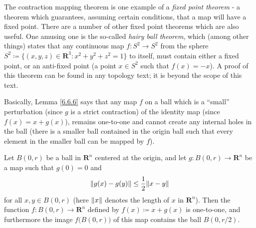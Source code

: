\begin{remark}\label{6.6.5}
    The contraction mapping theorem is one example of a \emph{fixed point theorem}
    - a theorem which guarantees, assuming certain conditions, that a map will have a fixed point.
    There are a number of other fixed point theorems which are also useful.
    One amusing one is the so-called \emph{hairy ball theorem}, which (among other things) states that any continuous map \(f : S^2 \to S^2\) from the sphere \(S^2 \coloneqq \{(x, y, z) \in \mathbf{R}^3 : x^2 + y^2 + z^2 = 1\}\) to itself, must contain either a fixed point, or an anti-fixed point
    (a point \(x \in S^2\) such that \(f(x) = -x\)).
    A proof of this theorem can be found in any topology text;
    it is beyond the scope of this text.
\end{remark}

\begin{note}
    Basically, Lemma \ref{6.6.6} says that any map \(f\) on a ball which is a ``small'' perturbation (since \(g\) is a strict contraction) of the identity map (since \(f(x) = x + g(x)\)), remains one-to-one and cannot create any internal holes in the ball
    (there is a smaller ball contained in the origin ball such that every element in the smaller ball can be mapped by \(f\)).
\end{note}

\begin{lemma}\label{6.6.6}
    Let \(B(0, r)\) be a ball in \(\mathbf{R}^n\) centered at the origin, and let \(g : B(0, r) \to \mathbf{R}^n\) be a map such that \(g(0) = 0\) and
    \[
        \norm*{g(x) - g(y)} \leq \frac{1}{2} \norm*{x - y}
    \]
    for all \(x, y \in B(0, r)\)
    (here \(\norm*{x}\) denotes the length of \(x\) in \(\mathbf{R}^n\)).
    Then the function \(f : B(0, r) \to \mathbf{R}^n\) defined by \(f(x) \coloneqq x + g(x)\) is one-to-one, and furthermore the image \(f\big(B(0, r)\big)\) of this map contains the ball \(B(0, r / 2)\).
\end{lemma}

